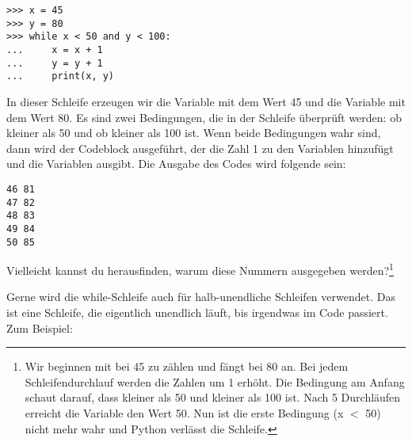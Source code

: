 \begin{Verbatim}[frame=single]
>>> x = 45
>>> y = 80
>>> while x < 50 and y < 100:
...     x = x + 1
...     y = y + 1
...     print(x, y)
\end{Verbatim}

In dieser Schleife erzeugen wir die Variable  mit dem Wert 45 und die Variable  mit dem Wert 80. Es sind zwei Bedingungen, die in der Schleife überprüft werden: ob  kleiner als 50 und ob  kleiner als 100 ist. Wenn beide Bedingungen wahr sind, dann wird der Codeblock ausgeführt, der die Zahl 1 zu den Variablen hinzufügt und die Variablen ausgibt. Die Ausgabe des Codes wird folgende sein:

\begin{Verbatim}[frame=single]
46 81
47 82
48 83
49 84
50 85
\end{Verbatim}

Vielleicht kannst du herausfinden, warum diese Nummern ausgegeben werden?\footnote{Wir beginnen mit  bei 45 zu zählen und  fängt bei 80 an. Bei jedem Schleifendurchlauf werden die Zahlen um 1 erhöht. Die Bedingung am Anfang schaut darauf, dass  kleiner als 50 und  kleiner als 100 ist. Nach 5 Durchläufen erreicht die Variable  den Wert 50. Nun ist die erste Bedingung (x $<$ 50) nicht mehr wahr und Python verlässt die Schleife.}

Gerne wird die while-Schleife auch für halb-unendliche Schleifen verwendet. Das ist eine Schleife, die eigentlich unendlich läuft, bis irgendwas im Code passiert. Zum Beispiel:

